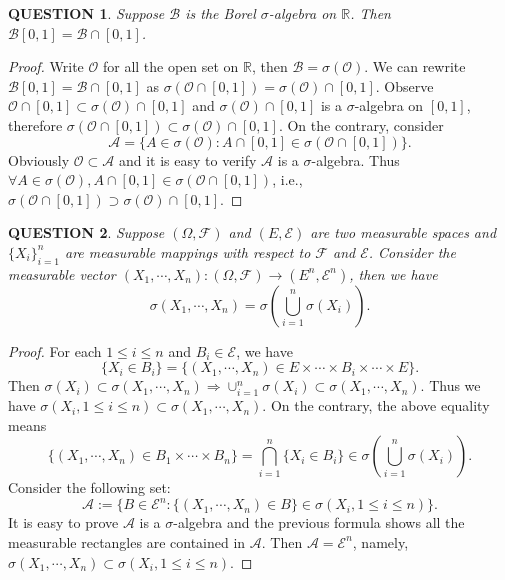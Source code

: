 \documentclass[12pt]{article}
\renewcommand{\b}{\mathscr{B}}
\renewcommand{\(}{\left(}%
\renewcommand{\)}{\right)}%
\renewcommand{\[}{\left[}%
\renewcommand{\]}{\right]}%
\renewcommand{\r}{\mathbb{R}}
\renewcommand{\a}{\mathscr{A}}
\newcommand{\f}{\mathscr{F}}
\newcommand{\e}{\mathscr{E}}
\newtheorem{question}{QUESTION}[section]}
\newtheorem{proof}{Proof.}}
\begin{document}
  \begin{question}
   Suppose $\b$ is the Borel $\sigma$-algebra on $\r$. Then $\b[0,1]=\b\cap [0,1]$.
  \end{question}
  \begin{proof}
   Write $\mathscr{O}$ for all the open set on $\r$, then $\b=\sigma(\mathscr{O})$. We can rewrite $\b[0,1]=\b\cap [0,1]$ as $\sigma(\mathscr{O}\cap [0,1] )=\sigma(\mathscr{O})\cap [0,1].$
   Observe $\mathscr{O}\cap [0,1]\subset \sigma(\mathscr{O})\cap [0,1]$ and $\sigma(\mathscr{O})\cap [0,1]$ is a $\sigma$-algebra on $[0,1]$, therefore $\sigma(\mathscr{O}\cap [0,1] )\subset\sigma(\mathscr{O})\cap [0,1]$. On the contrary, consider
   \begin{equation*}
    \a=\{A\in\sigma(\mathscr{O}):A\cap[0,1]\in  \sigma(\mathscr{O}\cap [0,1] ) \}.
   \end{equation*}
   Obviously $\mathscr{O}\subset\a$ and it is easy to verify $\a$ is a $\sigma$-algebra. Thus $\forall A\in \sigma(\mathscr{O}),A\cap[0,1]\in \sigma(\mathscr{O}\cap [0,1] )$, i.e., $\sigma(\mathscr{O}\cap [0,1] )\supset \sigma(\mathscr{O})\cap [0,1]$.
  \end{proof}

  \begin{question}
   Suppose $(\Omega,\f )$ and $(E,\mathscr{E})$ are two measurable spaces and $\{X_i\}_{i=1}^n$ are measurable mappings with respect to $\f$ and $\mathscr{E}$. Consider the measurable vector $(X_1,\cdots,X_n ):(\Omega,\f )\to(E^n,\e^n)$, then we have
   \begin{equation*}
    \sigma(X_1,\cdots,X_n)=\sigma\(\bigcup_{i=1}^n\sigma(X_i) \).
   \end{equation*}
  \end{question}
  \begin{proof}
   For each $1\leq i\leq n$ and $B_i\in\e$, we have
   \begin{equation*}
    \{X_i\in B_i\}=\{(X_1,\cdots,X_n)\in E\times\cdots\times B_i\times\cdots\times E \}.
   \end{equation*}
   Then $\sigma(X_i)\subset\sigma(X_1,\cdots,X_n)\Longrightarrow \cup_{i=1}^n \sigma(X_i)\subset\sigma(X_1,\cdots,X_n)$. Thus we have $\sigma(X_i,1\leq i\leq n)\subset \sigma(X_1,\cdots,X_n)$. On the contrary, the above equality means
   \begin{equation*}
    \{(X_1,\cdots,X_n)\in B_1\times\cdots\times B_n \}=\bigcap_{i=1}^n\{X_i\in B_i\}\in \sigma\(\bigcup_{i=1}^n\sigma(X_i) \).
   \end{equation*}
   Consider the following set:
   \begin{equation*}
    \a:=\{B\in\e^n:\{(X_1,\cdots,X_n)\in B\}\in \sigma(X_i,1\leq i\leq n)\}.
   \end{equation*}
   It is easy to prove $\a$ is a $\sigma$-algebra and the previous formula shows all the measurable rectangles are contained in $\a$. Then $\a=\e^n$, namely, $\sigma(X_1,\cdots,X_n)\subset \sigma(X_i,1\leq i\leq n)$.
  \end{proof}
\end{document}
